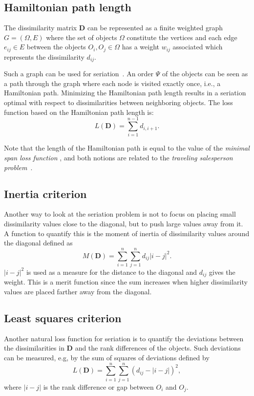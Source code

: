 \documentclass[fleqn, a4paper]{article}
\begin{document}
\subsection{Hamiltonian path length}
The dissimilarity matrix $\mathbf{D}$ can be represented as a finite weighted
graph $G = (\Omega,E)$ where the set of objects $\Omega$ constitute the
vertices and each edge $e_{ij} \in E$ between the objects $O_i, O_j \in \Omega$ 
has a weight $w_{ij}$ associated which represents the dissimilarity $d_{ij}$.

Such a graph can be used for seriation~\citep[see,
e.g.,][]{seriation:Hubert:1974,seriation:Caraux:2005}.  An order $\Psi$
of the objects can be seen as a path through the graph where each node
is visited exactly once, i.e., a Hamiltonian path.  Minimizing the
Hamiltonian path length results in a seriation optimal with respect to
dissimilarities between neighboring objects.  The loss function based on
the Hamiltonian path length is:
\begin{equation}
    L(\mathbf{D}) = \sum_{i=1}^{n-1} d_{i,i+1}.
\end{equation}

Note that the length of the Hamiltonian path is equal to the value of the
\emph{minimal span loss function} \citep[as used by][]{seriation:Chen:2002},
and both notions are related to the \emph{traveling salesperson
problem}~\citep{seriation:Gutin:2002}.

\subsection{Inertia criterion} 
Another way to look at the seriation problem is not to focus on placing small
dissimilarity values close to the diagonal, but to push large values away from
it. A function to quantify this is the moment of inertia of dissimilarity
values around the diagonal \citep{seriation:Caraux:2005} defined as
\begin{equation}
    M(\mathbf{D}) = \sum_{i=1}^n \sum_{j=1}^n d_{ij}|i-j|^2.
\end{equation}
$|i-j|^2$ is used as a measure for the distance to the diagonal and $d_{ij}$
gives the weight.  This is a merit function since the sum increases when higher
dissimilarity values are placed farther away from the diagonal.

\subsection{Least squares criterion} 
Another natural loss function for seriation is to quantify the deviations
between the dissimilarities in $\mathbf{D}$ and the rank differences of the
objects.  Such deviations can be measured, e.g, by the sum of squares of
deviations \citep{seriation:Caraux:2005} defined by
\begin{equation}
    L(\mathbf{D}) = \sum_{i=1}^n \sum_{j=1}^n (d_{ij} - |i-j|)^2,
\end{equation}
where $|i-j|$ is the rank difference or gap between $O_i$ and $O_j$.
\end{document}
